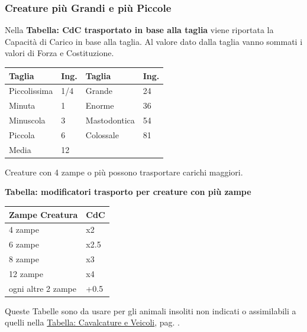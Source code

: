 \begin{multicols}{2}
\subsubsection{Creature più Grandi e più Piccole}\label{tagliaeportata}

Nella \textbf{Tabella: CdC trasportato in base alla taglia} viene riportata la Capacità di Carico in base alla taglia. Al valore dato dalla taglia vanno sommati i valori di Forza e Costituzione.

\medskip

\noindent\begin{tabularx}{\linewidth}{Xl|ll}
	\toprule
\rowcolor{gray!20}\textbf{Taglia}& \textbf{Ing.}&\textbf{Taglia} & \textbf{Ing.}\\
\toprule
Piccolissima &1/4				& Grande 	& 24\\
\rowcolor{gray!20}Minuta & 1 	& Enorme	& 36\\
Minuscola & 3					& Mastodontica&54\\
\rowcolor{gray!20}Piccola & 6 	& Colossale	&81\\
Media & 12&&
\end{tabularx}

\medskip

Creature con 4 zampe o più possono trasportare carichi maggiori.


\textbf{Tabella: modificatori trasporto per creature con più zampe}

\medskip

\noindent\begin{tabularx}{\linewidth}{Xl}
	\toprule
\rowcolor{gray!20}\textbf{Zampe Creatura}&\textbf{CdC}\\
\toprule
4 zampe & x2\\
\rowcolor{gray!20}6 zampe & x2.5\\
8 zampe & x3\\
\rowcolor{gray!20}12 zampe & x4\\
ogni altre 2 zampe & +0.5
\end{tabularx}

\medskip

Queste Tabelle sono da usare per gli animali insoliti non indicati o assimilabili a quelli nella \hyperlink{TabellaCavalcatureeVeicoli}{Tabella: Cavalcature e Veicoli}, pag. \pageref{TabellaCavalcatureeVeicoli}.


\end{multicols}
